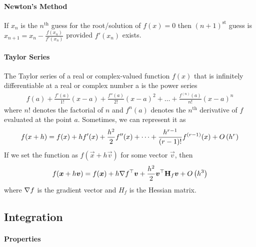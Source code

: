 \paragraph{Newton's Method}

If $x_n$ is the $n^\text{th}$ guess for the root/solution of $f(x)=0$ then $(n+1)^\text{st}$ guess is $x_{n+1}=x_n-\frac{f(x_n)}{f'(x_n)}$ provided $f'(x_n)$ exists.

\paragraph{Taylor Series}

The Taylor series of a real or complex-valued function $f(x)$ that is infinitely differentiable at a real or complex number a is the power series
\begin{align*}
	f(a)+\frac{f'(a)}{1!}(x-a)+\frac{f''(a)}{2!}(x-a)^2+\dots+\frac{f^{(n)}(a)}{n!}(x-a)^n
\end{align*}
where $n!$ denotes the factorial of $n$ and $f^{n}(a)$ denotes the $n^\text{th}$ derivative of $f$ evaluated at the point $a$. Sometimes, we can represent it as
\begin{align*}
	f(x+h)=f(x)+hf'(x)+\frac{h^2}{2}f''(x)+\cdots+\frac{h^{r-1}}{(r-1)!}f^{(r-1)}(x)+O\left(h^r\right)
\end{align*}
If we set the function as $f(\vec{x}+h\vec{v})$ for some vector $\vec{v}$, then
\begin{align*}
	f(\boldsymbol{x}+h\boldsymbol{v})=f(\boldsymbol{x})+h\nabla f{}^\top\boldsymbol{v}+\frac{h^2}{2}\boldsymbol{v}{}^\top \mathbf{H}_f\boldsymbol{v}+O\left(h^3\right)
\end{align*}
where $\nabla f$ is the gradient vector and $H_f$ is the Hessian matrix.

\subsection{Integration}

\paragraph{Properties}

